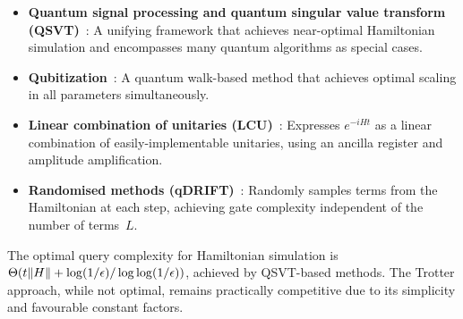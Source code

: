 \begin{itemize}
  \item \textbf{Quantum signal processing and quantum singular value
      transform (QSVT)}~\cite{QSVT2019}: A unifying framework that achieves
    near-optimal Hamiltonian simulation and encompasses many quantum
    algorithms as special cases.

  \item \textbf{Qubitization}~\cite{LowChuang2019}: A quantum walk-based
    method that achieves optimal scaling in all parameters simultaneously.

  \item \textbf{Linear combination of unitaries
      (LCU)}~\cite{ChildsLCU2012}: Expresses $e^{-iHt}$ as a linear
    combination of easily-implementable unitaries, using an ancilla register
    and amplitude amplification.

  \item \textbf{Randomised methods (qDRIFT)}~\cite{Campbell2019}: Randomly
    samples terms from the Hamiltonian at each step, achieving gate
    complexity independent of the number of terms~$L$.
\end{itemize}

\begin{remark}
  The optimal query complexity for Hamiltonian simulation is
  $\Theta(t\lVert H \rVert + \log(1/\epsilon)/\log\log(1/\epsilon))$, achieved by
  QSVT-based methods.  The Trotter approach, while not optimal, remains
  practically competitive due to its simplicity and favourable constant
  factors.
\end{remark}
